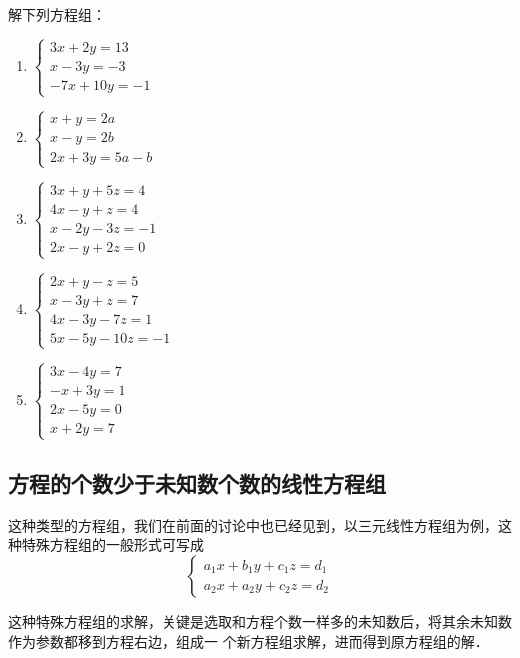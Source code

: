 \begin{ex}
解下列方程组：
\begin{multicols}{2}
\begin{enumerate}
\item  $\begin{cases}
    3 x+2 y=13 \\ x-3 y=-3 \\ -7 x+10 y=-1 
\end{cases}$
\item $\begin{cases}x+y=2 a \\ x-y=2 b \\ 2 x+3 y=5 a-b\end{cases}$
    \item $\begin{cases}3 x+y+5 z=4 \\ 4 x-y+z=4 \\ x-2 y-3 z=-1 \\ 2 x-y+2 z=0\end{cases}$
        \item $\begin{cases}2 x+y-z=5 \\ x-3 y+z=7 \\ 4 x-3 y-7 z=1 \\ 5 x-5 y-10 z=-1\end{cases}$
            \item $\begin{cases}3 x-4 y=7 \\ -x+3 y=1 \\ 2 x-5 y=0 \\ x+2 y=7\end{cases}$
\end{enumerate}
\end{multicols}
\end{ex}

\subsection{方程的个数少于未知数个数的线性方程组}
这种类型的方程组，我们在前面的讨论中也已经见到，以三元线性方程组为例，这种特殊方程组的一般形式可写成
\[\begin{cases}
    a_1x+b_1y+c_1z=d_1\\
    a_2x+a_2y+c_2z=d_2
\end{cases}\]

这种特殊方程组的求解，关键是选取和方程个数一样多的未知数后，将其余未知数作为参数都移到方程右边，组成一
个新方程组求解，进而得到原方程组的解．

